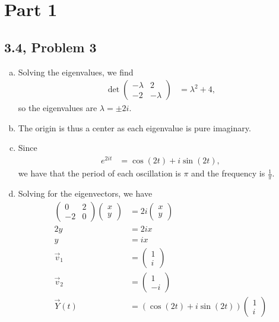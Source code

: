 \documentclass[10pt]{mypackage}
\begin{document}
\RaggedRight
\section{Part 1}%
\subsection{3.4, Problem 3}%
\begin{enumerate}[(a)]
  \item Solving the eigenvalues, we find
    \begin{align*}
      \det \begin{pmatrix}-\lambda & 2 \\ -2 & -\lambda\end{pmatrix} &= \lambda^2 + 4,
    \end{align*}
    so the eigenvalues are $\lambda = \pm 2i$.
  \item The origin is thus a center as each eigenvalue is pure imaginary.
  \item Since
    \begin{align*}
      e^{2it} &= \cos \left(2t\right) + i\sin \left(2t\right),
    \end{align*}
    we have that the period of each oscillation is $\pi$ and the frequency is $\frac{1}{\pi}$.
  \item Solving for the eigenvectors, we have
    \begin{align*}
      \begin{pmatrix}0 & 2 \\ -2 & 0\end{pmatrix} \begin{pmatrix}x\\y\end{pmatrix} &= 2i \begin{pmatrix}x\\y\end{pmatrix}\\
      2y &= 2ix\\
      y &= ix\\
      \vec{v}_1 &= \begin{pmatrix}1\\i\end{pmatrix}\\
      \vec{v}_2 &= \begin{pmatrix}1\\-i\end{pmatrix}\\
      \vec{Y}(t) &= \left(\cos \left(2t\right) + i\sin \left(2t\right)\right) \begin{pmatrix}1\\i\end{pmatrix}\\

\end{align*}
\end{enumerate}
\end{document}
